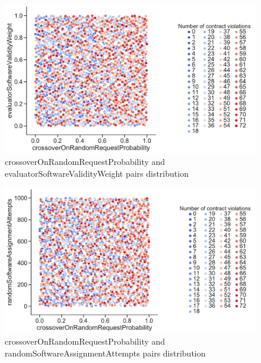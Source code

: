 \begin{figure}
	\centering
	\includegraphics[width=\textwidth]{images/PairsDistr/crossoverOnRandomRequestProbability_evaluatorSoftwareValidityWeight.pdf}
	\caption[crossoverOnRandomRequestProbability and evaluatorSoftwareValidityWeight pairs distribution]{crossoverOnRandomRequestProbability and evaluatorSoftwareValidityWeight pairs distribution}
	\label{fig:crossoverOnRandomRequestProbability_evaluatorSoftwareValidityWeight_pair}
\end{figure}
\begin{figure}
	\centering
	\includegraphics[width=\textwidth]{images/PairsDistr/crossoverOnRandomRequestProbability_randomSoftwareAssignmentAttempts.pdf}
	\caption[crossoverOnRandomRequestProbability and randomSoftwareAssignmentAttempts pairs distribution]{crossoverOnRandomRequestProbability and randomSoftwareAssignmentAttempts pairs distribution}
	\label{fig:crossoverOnRandomRequestProbability_randomSoftwareAssignmentAttempts_pair}
\end{figure}
